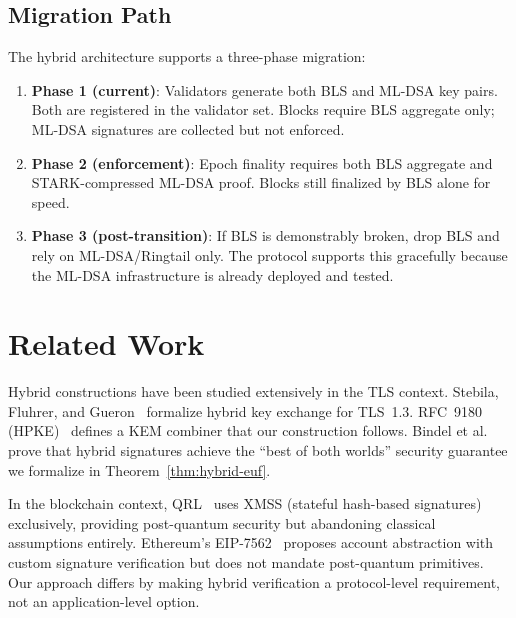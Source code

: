 \documentclass[11pt,a4paper]{article}
\begin{document}
\subsection{Migration Path}

The hybrid architecture supports a three-phase migration:

\begin{enumerate}[leftmargin=2em]
  \item \textbf{Phase 1 (current)}: Validators generate both BLS and ML-DSA key pairs.
        Both are registered in the validator set. Blocks require BLS aggregate only;
        ML-DSA signatures are collected but not enforced.
  \item \textbf{Phase 2 (enforcement)}: Epoch finality requires both BLS aggregate
        and STARK-compressed ML-DSA proof. Blocks still finalized by BLS alone
        for speed.
  \item \textbf{Phase 3 (post-transition)}: If BLS is demonstrably broken, drop BLS
        and rely on ML-DSA/Ringtail only. The protocol supports this gracefully because
        the ML-DSA infrastructure is already deployed and tested.
\end{enumerate}

\section{Related Work}

Hybrid constructions have been studied extensively in the TLS context.
Stebila, Fluhrer, and Gueron~\cite{stebila2020hybrid} formalize hybrid key exchange
for TLS~1.3. RFC~9180 (HPKE)~\cite{rfc9180} defines a KEM combiner that our
construction follows. Bindel et al.~\cite{bindel2019hybrid} prove that hybrid
signatures achieve the ``best of both worlds'' security guarantee we formalize in
Theorem~\ref{thm:hybrid-euf}.

In the blockchain context, QRL~\cite{qrl2018} uses XMSS (stateful hash-based
signatures) exclusively, providing post-quantum security but abandoning classical
assumptions entirely. Ethereum's EIP-7562~\cite{eip7562} proposes account abstraction
with custom signature verification but does not mandate post-quantum primitives. Our
approach differs by making hybrid verification a protocol-level requirement, not an
application-level option.
\end{document}
